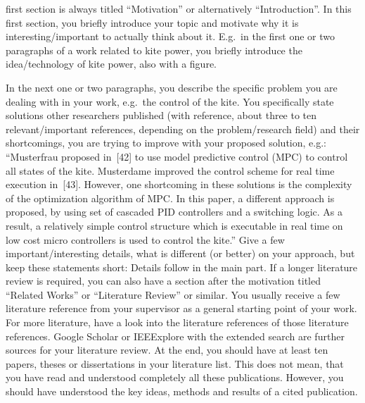 \documentclass[journal]{IEEEtran}
\begin{document}

first section is always titled “Motivation” or alternatively “Introduction”. In this first section, you briefly introduce your topic and motivate why it is interesting/important to actually think about it. E.g.\ in the first one or two paragraphs of a work related to kite power, you briefly introduce the idea/technology of kite power, also with a figure.

In the next one or two paragraphs, you describe the specific problem you are dealing with in your work, e.g.\ the control of the kite. You specifically state solutions other researchers published (with reference, about three to ten relevant/important references, depending on the problem/research field) and their shortcomings, you are trying to improve with your proposed solution, e.g.: “Musterfrau proposed in~[42] to use model predictive control (MPC) to control all states of the kite. Musterdame improved the control scheme for real time execution in~[43]. However, one shortcoming in these solutions is the complexity of the optimization algorithm of MPC. In this paper, a different approach is proposed, by using set of cascaded PID controllers and a switching logic. As a result, a relatively simple control structure which is executable in real time on low cost micro controllers is used to control the kite.” Give a few important/interesting details, what is different (or better) on your approach, but keep these statements short: Details follow in the main part. If a longer literature review is required, you can also have a section after the motivation titled “Related Works” or “Literature Review” or similar. You usually receive a few literature reference from your supervisor as a general starting point of your work. For more literature, have a look into the literature references of those literature references. Google Scholar or IEEExplore with the extended search are further sources for your literature review. At the end, you should have at least ten papers, theses or dissertations in your literature list. This does not mean, that you have read and understood completely all these publications. However, you should have understood the key ideas, methods and results of a cited publication.
\end{document}
